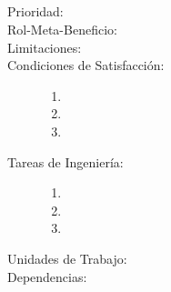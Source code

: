 \subsection{}

\begin{description}
    \item[Prioridad:]
    \item[Rol-Meta-Beneficio:] 
    \item[Limitaciones:] 
    \item[Condiciones de Satisfacción:]  \hfill
        \begin{enumerate}
            \item 
            \item 
            \item 
        \end{enumerate}
    \item[Tareas de Ingeniería:]  \hfill
        \begin{enumerate}
            \item 
            \item 
            \item 
        \end{enumerate}
    \item[Unidades de Trabajo:]
    \item[Dependencias:]
\end{description}

\newpage